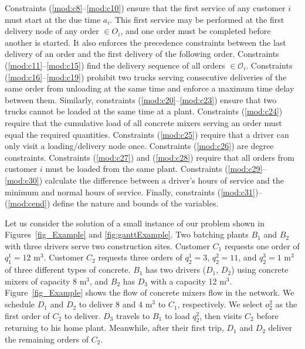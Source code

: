\documentclass{article}
\begin{document}
Constraints (\ref{mod:c8}--\ref{mod:c10}) ensure that the first service of any customer $i$ must start at the due time $a_i$. This first service may be performed at the first delivery node of any order $\in O_i$, and one order must be completed before another is started. It also enforces the precedence constraints between the last delivery of an order and the first delivery of the following order.
Constraints (\ref{mod:c11}--\ref{mod:c15}) find the delivery sequence of all orders $\in \mathcal{O}_i$. Constraints (\ref{mod:c16}--\ref{mod:c19}) prohibit two trucks serving consecutive deliveries of the same order from unloading at the same time and enforce a maximum time delay between them. Similarly, constraints (\ref{mod:c20}--\ref{mod:c23}) ensure that two trucks cannot be loaded at the same time at a plant. Constraints (\ref{mod:c24}) require that the cumulative load of all concrete mixers serving an order must equal the required quantities. Constraints (\ref{mod:c25}) require that a driver can only visit a loading/delivery node once. Constraints (\ref{mod:c26}) are degree constraints. Constraints (\ref{mod:c27}) and (\ref{mod:c28}) require that all orders from customer $i$ must be loaded from the same plant. Constraints (\ref{mod:c29}--\ref{mod:c30}) calculate the difference between a driver's hours of service and the minimum and normal hours of service. Finally, constraints (\ref{mod:c31})--(\ref{mod:cend}) define the nature and bounds of the variables.
 
Let us consider the solution of a small instance of our problem shown in Figures~\ref{fig_Example} and \ref{fig:ganttExample}. Two batching plants $B_1$ and $B_2$ with three drivers serve two construction sites. Customer $C_1$ requests one order of $q^1_1=12$ m$^3$. Customer $C_2$ requests three orders of $q^1_2=3$, $q^2_2=11$, and $q^3_2=1$ m$^3$ of three different types of concrete. $B_1$ has two drivers ($D_1$, $D_2$) using concrete mixers of capacity 8 m$^3$, and $B_2$ has $D_3$ with a capacity 12 m$^3$. Figure~\ref{fig_Example} shows the flow of concrete mixers flow in the network. We schedule $D_1$ and $D_2$ to deliver 8 and 4 m$^3$ to $C_1$, respectively. We select $o^2_2$ as the first order of $C_2$ to deliver. $D_3$ travels to $B_1$ to load $q^2_2$, then visits $C_2$ before returning to his home plant. Meanwhile, after their first trip,  $D_1$ and $D_2$ deliver the remaining orders of $C_2$.
\end{document}
